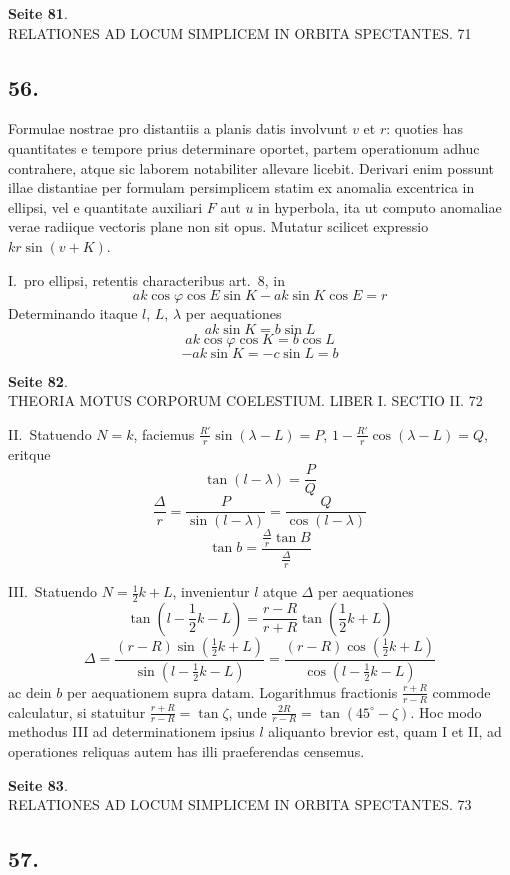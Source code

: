 \documentclass[12pt,a4paper]{article}
\begin{document}
\textbf{Seite 81}.\\
RELATIONES AD LOCUM SIMPLICEM IN ORBITA SPECTANTES. 71

\subsection*{56.}

Formulae nostrae pro distantiis a planis datis involvunt $v$ et $r$: quoties has quantitates e tempore prius determinare oportet, partem operationum adhuc contrahere, atque sic laborem notabiliter allevare licebit. Derivari enim possunt illae distantiae per formulam persimplicem statim ex anomalia excentrica in ellipsi, vel e quantitate auxiliari $F$ aut $u$ in hyperbola, ita ut computo anomaliae verae radiique vectoris plane non sit opus. Mutatur scilicet expressio $kr \sin(v + K)$.

I.~pro ellipsi, retentis characteribus art.~8, in
\[
ak \cos \varphi \cos E \sin K - ak \sin K \cos E = r
\]
Determinando itaque $l$, $L$, $\lambda$ per aequationes
\[
ak \sin K = b \sin L
\]
\[
ak \cos \varphi \cos K = b \cos L
\]
\[
-ak \sin K = -c \sin L = b
\]

\textbf{Seite 82}.\\
THEORIA MOTUS CORPORUM COELESTIUM. LIBER I. SECTIO II. 72

II.~Statuendo $N = k$, faciemus $\frac{R'}{r} \sin(\lambda - L) = P$, $1 - \frac{R'}{r} \cos(\lambda - L) = Q$, eritque
\[
\tan(l - \lambda) = \frac{P}{Q}
\]
\[
\frac{\Delta}{r} = \frac{P}{\sin(l - \lambda)} = \frac{Q}{\cos(l - \lambda)}
\]
\[
\tan b = \frac{\frac{\Delta}{r} \tan B}{\frac{\Delta}{r}}
\]

III.~Statuendo $N = \frac{1}{2} k + L$, invenientur $l$ atque $\Delta$ per aequationes
\[
\tan(l - \frac{1}{2}k - L) = \frac{r - R}{r + R} \tan(\frac{1}{2}k + L)
\]
\[
\Delta = \frac{(r - R) \sin(\frac{1}{2}k + L)}{\sin(l - \frac{1}{2}k - L)} = \frac{(r - R) \cos(\frac{1}{2}k + L)}{\cos(l - \frac{1}{2}k - L)}
\]
ac dein $b$ per aequationem supra datam. Logarithmus fractionis $\frac{r+R}{r-R}$ commode calculatur, si statuitur $\frac{r+R}{r-R} = \tan \zeta$, unde $\frac{2R}{r-R} = \tan(45^\circ - \zeta)$. Hoc modo methodus III ad determinationem ipsius $l$ aliquanto brevior est, quam I et II, ad operationes reliquas autem has illi praeferendas censemus.

\textbf{Seite 83}.\\
RELATIONES AD LOCUM SIMPLICEM IN ORBITA SPECTANTES. 73

\subsection*{57.}
\end{document}
